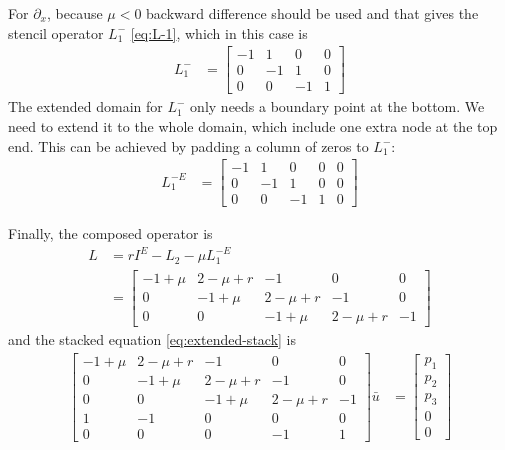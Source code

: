 \documentclass[11pt]{article}
\newcommand{\D}[1][]{\ensuremath{\partial_{#1}}}
\begin{document}
For $\D[x]$, because $\mu < 0$ backward difference should be used and that gives the stencil operator $L^-_1$ \cref{eq:L-1}, which in this case is
\begin{align}
	L^-_1 &= \begin{bmatrix}
			-1 & 1 & 0 & 0 \\
			0 & -1 & 1 & 0 \\
			0 & 0 & -1 & 1
		\end{bmatrix}
\end{align}
The extended domain for $L^-_1$ only needs a boundary point at the bottom. We need to extend it to the whole domain, which include one extra node at the top end. This can be achieved by padding a column of zeros to $L^-_1$:
\begin{align}
	L^{-E}_1 &= \begin{bmatrix}
			-1 & 1 & 0 & 0 & 0\\
			0 & -1 & 1 & 0 & 0\\
			0 & 0 & -1 & 1 & 0
		\end{bmatrix}
\end{align}

Finally, the composed operator is
\begin{align}
	L &= rI^E - L_2 - \mu L^{-E}_1 \\
	  &= \begin{bmatrix}
		-1 + \mu & 2 -\mu + r & -1 & 0 & 0\\
		0 & -1 + \mu & 2 - \mu +r & -1 & 0\\
		0 & 0 & -1 + \mu & 2 - \mu +r & -1
	  \end{bmatrix}
\end{align}
and the stacked equation \cref{eq:extended-stack} is
\begin{align}
	\begin{bmatrix}
		-1 + \mu & 2 -\mu + r & -1 & 0 & 0\\
		0 & -1 + \mu & 2 - \mu +r & -1 & 0\\
		0 & 0 & -1 + \mu & 2 - \mu +r & -1\\
		1 & -1 & 0 & 0 & 0\\
		0 & 0 & 0 & -1 & 1
	\end{bmatrix} \bar{u} &= \begin{bmatrix} p_1 \\ p_2 \\ p_3 \\ 0 \\ 0\end{bmatrix}
\end{align}
\end{document}
